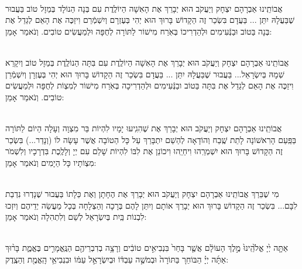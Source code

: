 \documentclass[twoside, openany, parskip=half, 11pt]{book}
\begin{document}
\begin{sometimes}

\\
אֲבוֹתֵֽינוּ אַבְרָהָם יִצְחָק וְיַעֲקֹב הוּא יְבָרֵךְ אֶת הָאִשָׁה הַיוֹלֶֽדֶת 
 עִם בְּנָה הַנוֹלָד בְּמַזָל טוֹב בַּעֲבוּר שֶׁבַּעֲלָהּ יִתֵּן ... בַּעֲדָם בִּשְׂכַר זֶה הַקָדוֹשׁ בָּרוּךְ הוּא יְהִי בְּעֶזְרָם וְיִשְׁמְֿרֵם וִיזַכֶּה אֶת הָאֵם לְגַדֵל אֶת בְּנָה בַּטוֹב וּבַנְּֿעִימִים וּלְהַדְרִיכוֹ בְּאֹֽרַח מִישׁוֹר לַתּוֹרָה לְחֻפָּה וּלְמַעֲשִׂים טוֹבִים. וְנֹאמַר אָמֵן:\clearpage

\vspace{-.5\baselineskip}
\\
 אֲבוֹתֵֽינוּ אַבְרָהָם יִצְחָק וְיַעֲקֹב הוּא יְבָרֵךְ אֶת הָאִשָׁה הַיוֹלֶֽדֶת 
 עִם בִּתָּה הַנוֹלֶֽדֶת בְּמַזָל טוֹב וְיִקָרֵא שְׁמָהּ בְּיִשְׂרָאֵל... בַּעֲבוּר שֶׁבַּעֲלָהּ יִתֵּן ... בַּעֲדָם בִּשְׂכַר זֶה הַקָדוֹשׁ בָּרוּךְ הוּא יְהִי בְּעֶזְרָן וְיִשְׁמְֿרֵן וִיזַכֶּה אֶת הָאֵם לְגַדֵל אֶת בִּתָּה בַּטוֹב ובַנְּֿעִימִים וּלְהַדְרִיכָה בְּאֹֽרַח מִישׁוֹר לְמִצְוֹת לְחֻפָּה וּלְמַעֲשִׂים טוֹבִים. וְנֹאמַר אָמֵן:

\\
אֲבוֹתֵֽינוּ אַבְרָהָם יִצְחָק וְיַעֲקֹב הוּא יְבָרֵךְ אֶת 
 שֶׁהִגִֽיעוּ יָמָיו לִהְיוֹת בַּר מִצְוָה וְעָלָה הַיוֹם לַתּוֹרָה בַּפַּֽעַם הָרִאשׁוֹנָה לָתֵת שֶֽׁבַח וְהוֹדָאָה לְהַשֵׁם יִתְבָּרַךְ עַל כָּל הַטוֹבָה אֲשֶׁר עָשָׂה לוֹ (וְנָדַר...) בִּשְׂכַר זֶה הַקָדוֹשׁ בָּרוּךְ הוּא יִשְׁמְרֵֽהוּ וִיחַיֵֽהוּ וִיכוֹנֵן אֶת לִבּוֹ לִהְיוֹת שָׁלֵם עִם יְיָ וְלָלֶֽכֶת בִּדְרָכָיו וְלִשְׁמֹר מִצְוֹתָיו כָּל הַיָמִים וְנֹאמַר אָמֵן:


\\
מִי שֶׁבֵּרַךְ אֲבוֹתֵֽינוּ אַבְרָהָם יִצְחָק וְיַעֲקֹב הוּא יְבָרֵךְ אֶת הֶחָתָן  וְאֶת כַּלָתוֹ בַּעֲבוּר שֶׁנָדְרוּ נִדְבַת לִבָּם... בִּשְׂכַר זֶה הַקָדוֹשׁ בָּרוּךְ הוּא יְבָרֵךְ אוֹתָם וְיִתֵּן לָהֶם בְּרָכָה וְהַצְלָחָה בְּכָל מַעֲשֵׂה יְדֵיהֶם וְיִזְכוּ לִבְנוֹת בַּֽיִת בְּיִשְׂרָאֵל לְשֵׁם וְלִתְהִלָה  וְנֹאמַר אָמֵן:


\end{sometimes}

\halfkaddish

\hagbaha




\\
 אַתָּ֤ה יְ֙יָ אֱלֹ֙הֵֽינוּ֙ מֶ֣לֶךְ הָעוֹלָ֔ם אֲשֶׁ֤ר בָּחַר֙ בִּנְבִיאִ֣ים טוֹבִ֔ים וְרָצָ֥ה בְדִבְרֵיהֶ֖ם הַנֶּֽאֱמָרִ֣ים בֶּאֱמֶ֑ת בָּר֨וּךְ אַתָּ֜ה יְיָ֗ הַבּוֹחֵר֚ בַּתּוֹרָה֙ וּבְמֹשֶׁ֣ה עַבְדּ֔וֹ וּבְיִשְׂרָאֵ֣ל עַמּ֔וֹ וּבִנְבִיאֵ֥י הָֽאֱמֶ֖ת וְהַצֶֽדֶק:
\end{document}
